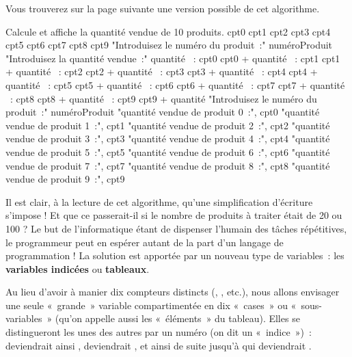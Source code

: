 		Vous trouverez sur la page suivante
		une version possible de cet algorithme.
	
		\begin{LDA}
		\LComment Calcule et affiche la quantité vendue de 10 produits.
			\Empty
			\Empty
			\Let cpt0 
			\Let cpt1 
			\Let cpt2 
			\Let cpt3 
			\Let cpt4 
			\Let cpt5 
			\Let cpt6 
			\Let cpt7 
			\Let cpt8 
			\Let cpt9 
			\Empty
			\Write "Introduisez le numéro du produit~:"
			\Read numéroProduit
			\Empty
			\Empty
				\Write "Introduisez la quantité vendue~:"
				\Read quantité
				\Empty
					~: cpt0 \Gets cpt0 + quantité
					~: cpt1 \Gets cpt1 + quantité
					~: cpt2 \Gets cpt2 + quantité
					~: cpt3 \Gets cpt3 + quantité
					~: cpt4 \Gets cpt4 + quantité
					~: cpt5 \Gets cpt5 + quantité
					~: cpt6 \Gets cpt6 + quantité
					~: cpt7 \Gets cpt7 + quantité
					~: cpt8 \Gets cpt8 + quantité
					~: cpt9 \Gets cpt9 + quantité
				\EndSwitch
				\Empty
				\Write "Introduisez le numéro du produit~:"
				\Read numéroProduit
				\Empty
			\EndWhile
			\Empty
			\Write "quantité vendue de produit 0~:", cpt0
			\Write "quantité vendue de produit 1~:", cpt1
			\Write "quantité vendue de produit 2~:", cpt2
			\Write "quantité vendue de produit 3~:", cpt3
			\Write "quantité vendue de produit 4~:", cpt4
			\Write "quantité vendue de produit 5~:", cpt5
			\Write "quantité vendue de produit 6~:", cpt6
			\Write "quantité vendue de produit 7~:", cpt7
			\Write "quantité vendue de produit 8~:", cpt8
			\Write "quantité vendue de produit 9~:", cpt9
			\Empty
		\EndAlgo
		\end{LDA}
	
		Il est clair, à la lecture de cet algorithme, 
		qu’une simplification d’écriture s’impose ! 
		Et que ce passerait-il si le nombre de produits à
		traiter était de 20 ou 100 ? 
		Le but de l’informatique étant de dispenser l’humain 
		des tâches répétitives, 
		le programmeur peut en espérer autant 
		de la part d’un langage de programmation !
		La solution est apportée par un nouveau type de variables~: 
		les \textbf{variables indicées} ou \textbf{tableaux}.
	
		Au lieu d’avoir à manier dix compteurs distincts
		(, , etc.), 
		nous allons envisager une seule «~grande~» variable 
		 compartimentée en dix «~cases~» ou «~sous-variables~»
		(qu'on appelle aussi les «~éléments~» du tableau). 
		Elles se distingueront les unes des autres par un numéro 
		(on dit un «~indice~»)~: 
		 deviendrait ainsi , 
		 deviendrait , 
		et ainsi de suite jusqu’à
		 qui deviendrait .
	
